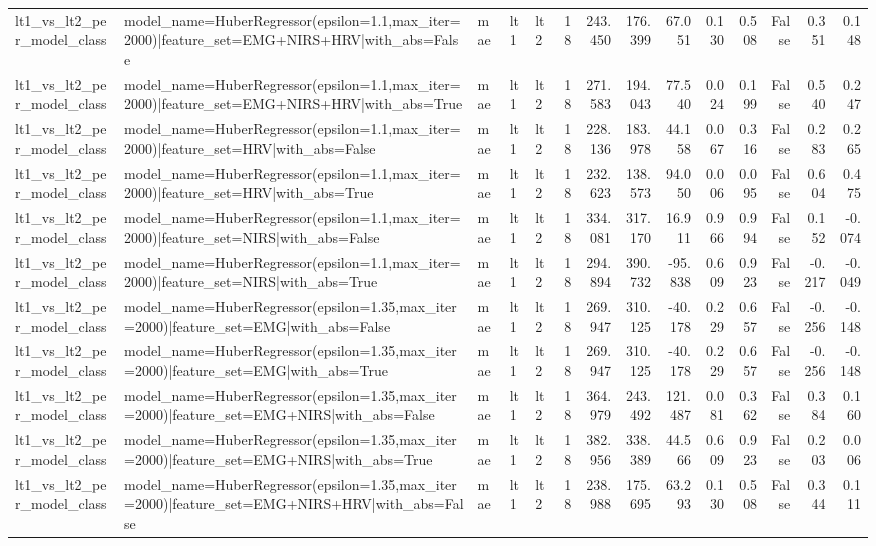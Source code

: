 \begin{table}
\begin{tabular}{lllllrrrrrrrrr}
lt1_vs_lt2_per_model_class & model_name=HuberRegressor(epsilon=1.1,max_iter=2000)|feature_set=EMG+NIRS+HRV|with_abs=False & mae & lt1 & lt2 & 18 & 243.450 & 176.399 & 67.051 & 0.130 & 0.508 & False & 0.351 & 0.148 \\
lt1_vs_lt2_per_model_class & model_name=HuberRegressor(epsilon=1.1,max_iter=2000)|feature_set=EMG+NIRS+HRV|with_abs=True & mae & lt1 & lt2 & 18 & 271.583 & 194.043 & 77.540 & 0.024 & 0.199 & False & 0.540 & 0.247 \\
lt1_vs_lt2_per_model_class & model_name=HuberRegressor(epsilon=1.1,max_iter=2000)|feature_set=HRV|with_abs=False & mae & lt1 & lt2 & 18 & 228.136 & 183.978 & 44.158 & 0.067 & 0.316 & False & 0.283 & 0.265 \\
lt1_vs_lt2_per_model_class & model_name=HuberRegressor(epsilon=1.1,max_iter=2000)|feature_set=HRV|with_abs=True & mae & lt1 & lt2 & 18 & 232.623 & 138.573 & 94.050 & 0.006 & 0.095 & False & 0.604 & 0.475 \\
lt1_vs_lt2_per_model_class & model_name=HuberRegressor(epsilon=1.1,max_iter=2000)|feature_set=NIRS|with_abs=False & mae & lt1 & lt2 & 18 & 334.081 & 317.170 & 16.911 & 0.966 & 0.994 & False & 0.152 & -0.074 \\
lt1_vs_lt2_per_model_class & model_name=HuberRegressor(epsilon=1.1,max_iter=2000)|feature_set=NIRS|with_abs=True & mae & lt1 & lt2 & 18 & 294.894 & 390.732 & -95.838 & 0.609 & 0.923 & False & -0.217 & -0.049 \\
lt1_vs_lt2_per_model_class & model_name=HuberRegressor(epsilon=1.35,max_iter=2000)|feature_set=EMG|with_abs=False & mae & lt1 & lt2 & 18 & 269.947 & 310.125 & -40.178 & 0.229 & 0.657 & False & -0.256 & -0.148 \\
lt1_vs_lt2_per_model_class & model_name=HuberRegressor(epsilon=1.35,max_iter=2000)|feature_set=EMG|with_abs=True & mae & lt1 & lt2 & 18 & 269.947 & 310.125 & -40.178 & 0.229 & 0.657 & False & -0.256 & -0.148 \\
lt1_vs_lt2_per_model_class & model_name=HuberRegressor(epsilon=1.35,max_iter=2000)|feature_set=EMG+NIRS|with_abs=False & mae & lt1 & lt2 & 18 & 364.979 & 243.492 & 121.487 & 0.081 & 0.362 & False & 0.384 & 0.160 \\
lt1_vs_lt2_per_model_class & model_name=HuberRegressor(epsilon=1.35,max_iter=2000)|feature_set=EMG+NIRS|with_abs=True & mae & lt1 & lt2 & 18 & 382.956 & 338.389 & 44.566 & 0.609 & 0.923 & False & 0.203 & 0.006 \\
lt1_vs_lt2_per_model_class & model_name=HuberRegressor(epsilon=1.35,max_iter=2000)|feature_set=EMG+NIRS+HRV|with_abs=False & mae & lt1 & lt2 & 18 & 238.988 & 175.695 & 63.293 & 0.130 & 0.508 & False & 0.344 & 0.111 \\

\end{tabular}
\end{table}
